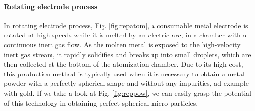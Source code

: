 \paragraph{Rotating electrode process} In rotating electrode process, Fig. \ref{fig:repatom}, a consumable metal electrode is rotated at high speeds while it is melted by an electric arc, in a chamber with a continuous inert gas flow. As the molten metal is exposed to the high-velocity inert gas stream, it rapidly solidifies and breaks up into small droplets, which are then collected at the bottom of the atomization chamber. Due to its high cost, this production method is typically used when it is necessary to obtain a metal powder with a perfectly spherical shape and without any impurities, ad example with gold. If we take a look at Fig. \ref{fig:reppow}, we can easily grasp the potential of this technology in obtaining perfect spherical micro-particles.
